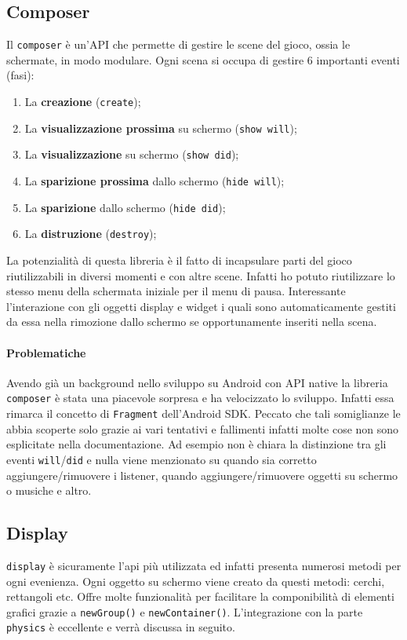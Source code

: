 	\subsection{Composer}
		Il \verb|composer| è un'API che permette di gestire le scene del gioco, ossia le schermate, in modo modulare. Ogni scena si occupa di gestire 6 importanti eventi (fasi):
		\begin{enumerate}
			\item La \textbf{creazione} (\verb|create|);
			\item La \textbf{visualizzazione prossima} su schermo (\verb|show will|);
			\item La \textbf{visualizzazione} su schermo (\verb|show did|);
			\item La \textbf{sparizione prossima} dallo schermo (\verb|hide will|);
			\item La \textbf{sparizione} dallo schermo (\verb|hide did|);
			\item La \textbf{distruzione} (\verb|destroy|);
		\end{enumerate}
		La potenzialità di questa libreria è il fatto di incapsulare parti del gioco riutilizzabili in diversi momenti e con altre scene. Infatti ho potuto riutilizzare lo stesso menu della schermata iniziale per il menu di pausa. Interessante l'interazione con gli oggetti display e widget i quali sono automaticamente gestiti da essa nella rimozione dallo schermo se opportunamente inseriti nella scena.
		
		\paragraph{Problematiche}
		Avendo già un background nello sviluppo su Android con API native la libreria \verb|composer| è stata una piacevole sorpresa e ha velocizzato lo sviluppo. Infatti essa rimarca il concetto di \verb|Fragment| dell'Android SDK. Peccato che tali somiglianze le abbia scoperte solo grazie ai vari tentativi e fallimenti infatti molte cose non sono esplicitate nella documentazione. Ad esempio non è chiara la distinzione tra gli eventi \verb|will|/\verb|did| e nulla viene menzionato su quando sia corretto aggiungere/rimuovere i listener, quando aggiungere/rimuovere oggetti su schermo o musiche e altro.
		
		
	\subsection{Display}
		\verb|display| è sicuramente l'api più utilizzata ed infatti presenta numerosi metodi per ogni evenienza. Ogni oggetto su schermo viene creato da questi metodi: cerchi, rettangoli etc. Offre molte funzionalità per facilitare la componibilità di elementi grafici grazie a \verb|newGroup()| e \verb|newContainer()|. L'integrazione con la parte \verb|physics| è eccellente e verrà discussa in seguito. 
		
